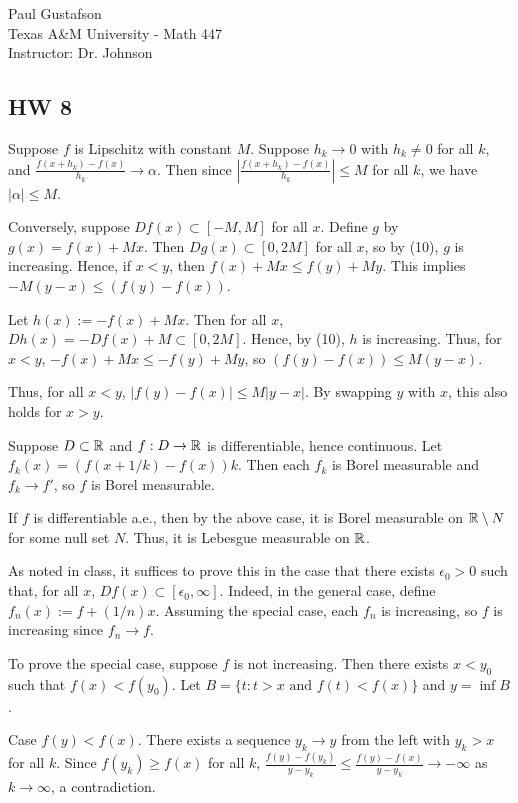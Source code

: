 \documentclass{article}
\begin{document}
\noindent Paul Gustafson\\
\noindent Texas A\&M University - Math 447\\ 
\noindent Instructor: Dr. Johnson

\subsection*{HW 8}
  Suppose $f$ is Lipschitz with constant $M$. Suppose $h_k \to 0$ with $h_k \neq 0$ for all $k$, and $\frac {f(x + h_k) - f(x)}{h_k} \to \alpha$.
Then since $|\frac {f(x + h_k) - f(x)}{h_k}| \le M$ for all $k$, we have $|\alpha| \le M$.

Conversely, suppose $Df(x) \subset [-M, M]$ for all $x$.  Define $g$ by $g(x) = f(x) + Mx$. Then $Dg(x) \subset [0, 2M]$ for all $x$, so by (10), $g$ is increasing. Hence, if $x < y$, then $f(x) + Mx \le f(y) + My$.  This implies $-M (y- x) \le (f(y) - f(x))$.

Let $h(x) := -f(x) + Mx$. Then for all $x$, $Dh(x) = -Df(x) + M \subset [0, 2M]$.
Hence, by (10), $h$ is increasing. Thus, for $x < y$, $-f(x) + Mx \le -f(y) + My$, so $(f(y) - f(x)) \le M(y-x)$.

Thus, for all $x < y$, $|f(y) - f(x)| \le M |y - x|$.  By swapping $y$ with $x$, this also holds for $x > y$.

 Suppose $D \subset \mathbb{R}$ and $f: D \to \mathbb{R}$ is differentiable, hence continuous.  Let $f_k(x) = (f(x + 1/k) - f(x))k$. Then each $f_k$ is Borel measurable and $f_k \to f'$, so $f$ is Borel measurable.

If $f$ is differentiable a.e., then by the above case, it is Borel measurable on $\mathbb{R} \setminus N$ for some null set $N$. Thus, it is Lebesgue measurable on $\mathbb{R}$.

 As noted in class, it suffices to prove this in the case that there exists $\epsilon_0 > 0$ such that, for all $x$, $Df(x) \subset [\epsilon_0, \infty]$. Indeed, in the general case, define $f_n(x) := f + (1/n)x$. Assuming the special case, each $f_n$ is increasing, so $f$ is increasing since $f_n \to f$.

To prove the special case, suppose $f$ is not increasing.  Then there exists $x < y_0$ such that $f(x) < f(y_0)$.  Let $B  = \{t : t > x \text{ and } f(t) < f(x)\}$ and $y = \inf B$. 

Case $f(y) < f(x)$. There exists a sequence $y_k \to y$ from the left with $y_k > x$ for all $k$. Since $f(y_k) \ge f(x)$ for all $k$,  $\frac {f(y) - f(y_k)}{y - y_k} \le \frac {f(y) - f(x)}{y - y_k} \to -\infty$ as $k \to \infty$, a contradiction.
\end{document}
